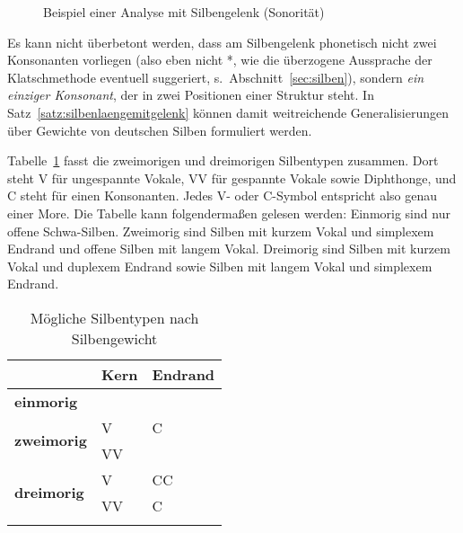 \begin{figure}[h]
  \centering
  \caption{Beispiel einer Analyse mit Silbengelenk (Sonorität)}
  \label{fig:silbgel002}
\end{figure}

Es kann nicht überbetont werden, dass am Silbengelenk phonetisch nicht zwei Konsonanten vorliegen (also eben nicht *\textipa{[mIt.t@]}, wie die überzogene Aussprache der Klatschmethode eventuell suggeriert, s.\ Abschnitt~\ref{sec:silben}), sondern \textit{ein einziger Konsonant}, der in zwei Positionen einer Struktur steht.
In Satz~\ref{satz:silbenlaengemitgelenk} können damit weitreichende Generalisierungen über Gewichte von deutschen Silben formuliert werden.


Tabelle~\ref{tab:morentypen} fasst die zweimorigen und dreimorigen Silbentypen zusammen.
Dort steht V für ungespannte Vokale, VV für gespannte Vokale sowie Diphthonge, und C steht für einen Konsonanten.
Jedes V- oder C-Symbol entspricht also genau einer More.
Die Tabelle kann folgendermaßen gelesen werden:
Einmorig sind nur offene Schwa-Silben.
Zweimorig sind Silben mit kurzem Vokal und simplexem Endrand und offene Silben mit langem Vokal.
Dreimorig sind Silben mit kurzem Vokal und duplexem Endrand sowie Silben mit langem Vokal und simplexem Endrand.

\begin{table}[!htbp]
	\centering
	\begin{tabular}{lll}
		\lsptoprule
		 & \textbf{Kern} & \textbf{Endrand} \\
		\midrule
		\textbf{einmorig} & \textipa{@} & \\
		\midrule
		\multirow{2}{*}{\textbf{zweimorig}} & V & C \\
		& VV & \\
		\midrule
		\multirow{2}{*}{\textbf{dreimorig}} & V & CC \\
		& VV & C \\
		\lspbottomrule
	\end{tabular}
	\caption{Mögliche Silbentypen nach Silbengewicht}	
	\label{tab:morentypen}
\end{table}

